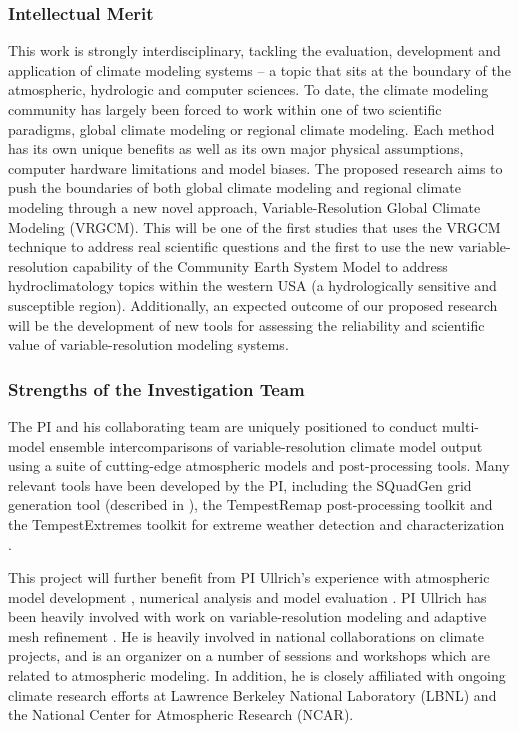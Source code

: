\documentclass[11pt]{article}
\begin{document}
\subsubsection{Intellectual Merit}

This work is strongly interdisciplinary, tackling the evaluation, development and application of climate modeling systems -- a topic that sits at the boundary of the atmospheric, hydrologic and computer sciences.  To date, the climate modeling community has largely been forced to work within one of two scientific paradigms, global climate modeling or regional climate modeling.  Each method has its own unique benefits as well as its own major physical assumptions, computer hardware limitations and model biases.  The proposed research aims to push the boundaries of both global climate modeling and regional climate modeling through a new novel approach, Variable-Resolution Global Climate Modeling (VRGCM).  This will be one of the first studies that uses the VRGCM technique to address real scientific questions and the first to use the new variable-resolution capability of the Community Earth System Model to address hydroclimatology topics within the western USA (a hydrologically sensitive and susceptible region).  Additionally, an expected outcome of our proposed research will be the development of new tools for assessing the reliability and scientific value of variable-resolution modeling systems. 

\subsubsection{Strengths of the Investigation Team}

The PI and his collaborating team are uniquely positioned to conduct multi-model ensemble intercomparisons of variable-resolution climate model output using a suite of cutting-edge atmospheric models and post-processing tools.  Many relevant tools have been developed by the PI, including the SQuadGen grid generation tool (described in \cite{guba2014viscosity}), the TempestRemap post-processing toolkit \citep{ullrich2015remapping} and the TempestExtremes toolkit for extreme weather detection and characterization \citep{ullrich2015extremes}.

This project will further benefit from PI Ullrich's experience with atmospheric model development  \cite{ullrich2010high, PHLPAURDN2011SPRINGER, ullrich2012operator, ullrich2012mcore, ullrich2014fluxform, guba2014viscosity, ullrich2014understanding, ullrich2014global}, numerical analysis \cite{ullrich2011analysis, ullrich2012considerations} and model evaluation \cite{DCMIP2012TESTCASES, ullrich2014proposed, kent2013dynamical, ullrich2014baroclinic}.  PI Ullrich has been heavily involved with work on variable-resolution modeling \citep{zarzycki2014aquaplanet} and adaptive mesh refinement  \citep{collins2013nonhydrostatic, mccorquodale2014adaptive}. He is heavily involved in national collaborations on climate projects, and is an organizer on a number of sessions and workshops which are related to atmospheric modeling. In addition, he is closely affiliated with ongoing climate research efforts at Lawrence Berkeley National Laboratory (LBNL) and the National Center for Atmospheric Research (NCAR).
\end{document}

